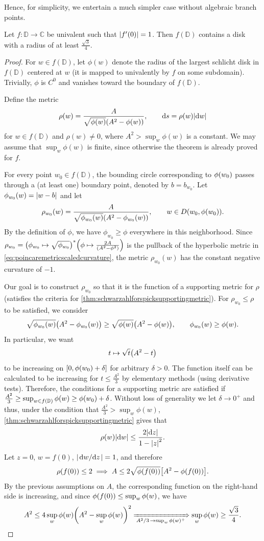 Hence, for simplicity, we entertain a much simpler case without algebraic branch points.
\begin{theorem}
    Let \(f:\mathbb{D}\to\mathbb{C}\) be univalent such that \(\abs{f'(0)}=1\). Then \(f(\mathbb{D})\) contains a disk with a radius of at least \(\frac{\sqrt{3}}{4}\).
\end{theorem}
\begin{proof}
    For \(w\in f(\mathbb{D})\), let \(\phi(w)\) denote the radius of the largest schlicht disk in \(f(\mathbb{D})\) centered at \(w\) (it is mapped to univalently by \(f\) on some subdomain). Trivially, \(\phi\) is \(C^0\) and vanishes toward the boundary of \(f(\mathbb{D})\).
    
    Define the metric \[\rho(w)=\frac{A}{\sqrt{\phi(w)}\qty(A^2-\phi(w))},\qquad\dd{s}=\rho(w)\abs{\dd{w}}\] for \(w\in f(\mathbb{D})\) and \(\rho(w)\neq 0\), where \(A^2>\sup_w\phi(w)\) is a constant. We may assume that \(\sup_w\phi(w)\) is finite, since otherwise the theorem is already proved for \(f\).

    For every point \(w_0\in f(\mathbb{D})\), the bounding circle corresponding to \(\phi\qty(w_0)\) passes through a (at least one) boundary point, denoted by \(b=b_{w_0}\). Let \(\phi_{w_0}(w)=\abs{w-b}\) and let \[\rho_{w_0}(w)=\frac{A}{\sqrt{\phi_{w_0}(w)}\qty(A^2-\phi_{w_0}(w))},\qquad w\in D\qty(w_0,\phi(w_0)).\]
    By the definition of \(\phi\), we have \(\phi_{w_0}\geq\phi\) everywhere in this neighborhood. Since \(\rho_{w_0}=\qty(\phi_{w_0}\mapsto\sqrt{\phi_{w_0}})^*\qty(\phi\mapsto\frac{2A}{\qty(A^2-\phi^2)})\) is the pullback of the hyperbolic metric in \cref{eq:poincaremetricscaledcurvature}, the metric \(\rho_{w_0}(w)\) has the constant negative curvature of \(-1\). 

    Our goal is to construct \(\rho_{w_0}\) so that it is the function of a supporting metric for \(\rho\) (satisfies the criteria for \cref{thm:schwarzahlforspicksupportingmetric}). For \(\rho_{w_0}\leq\rho\) to be satisfied, we consider \[\sqrt{\phi_{w_0}(w)}\qty(A^2-\phi_{w_0}(w))\geq\sqrt{\phi(w)}\qty(A^2-\phi(w)),\qquad\phi_{w_0}(w)\geq\phi(w).\] In particular, we want
    \[t\mapsto\sqrt{t}\qty(A^2-t)\]
    to be increasing on \(\qty[0,\phi\qty(w_0)+\delta]\) for arbitrary \(\delta>0\). The function itself can be calculated to be increasing for \(t\leq\frac{A^2}3\) by elementary methods (using derivative tests). Therefore, the conditions for a supporting metric are satisfied if \(\frac{A^2}3\geq\sup_{w\in f(\mathbb{D})}\phi(w)\geq\phi\qty(w_0)+\delta\). Without loss of generality we let \(\delta\to 0^+\) and thus, under the condition that \(\frac{A^2}3>\sup_{w}\phi(w)\), \cref{thm:schwarzahlforspicksupportingmetric} gives that \[\rho(w)\abs{\dd{w}}\leq\frac{2\abs{\dd{z}}}{1-\abs{z}^2}.\] Let \(z=0\), \(w=f(0)\), \(\abs{\dv*{w}{z}}=1\), and therefore \[\rho\qty(f(0))\leq 2\implies A\leq 2\sqrt{\phi\qty(f(0))}\qty[A^2-\phi\qty(f(0))].\] By the previous assumptions on \(A\), the corresponding function on the right-hand side is increasing, and since \(\phi\qty(f(0))\leq\sup_{w}\phi(w)\), we have \[A^2\leq 4\sup_{w}\phi(w)\qty(A^2-\sup_{w}\phi(w))^2\xRightarrow[\flatfrac{A^2}3\to\sup_{w}\phi(w)^+]{}\sup_{w}\phi(w)\geq\frac{\sqrt{3}}4.\qedhere\]
\end{proof}
